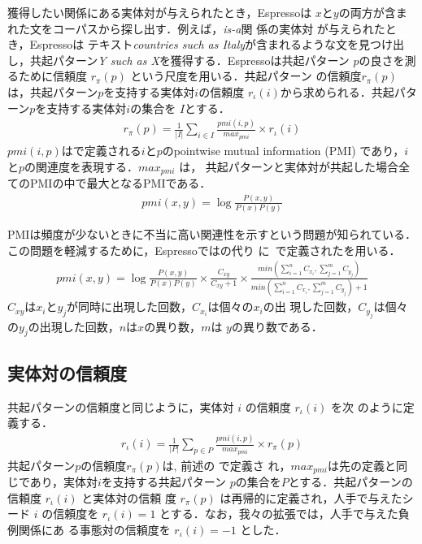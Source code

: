\documentclass[japanese]{jnlp_1.4}
\begin{document}
獲得したい関係にある実体対が与えられたとき，Espressoは
$x$と$y$の両方が含まれた文をコーパスから探し出す．例えば，\textsl{is-a}関
係の実体対 が与えられたとき，Espressoは
テキスト\textit{countries such as Italy}が含まれるような文を見つけ出
し，共起パターン\textit{Y such as X}を獲得する．Espressoは共起パターン
$p$の良さを測るために信頼度 $r_\pi(p)$ という尺度を用いる．共起パターン
の信頼度$r_\pi(p)$は，共起パターン$p$を支持する実体対$i$の信頼度
$r_\iota(i)$から求められる．共起パターン$p$を支持する実体対$i$の集合を
$I$とする．
\begin{eqnarray}
  \label{eq:rpi}
  r_\pi(p) = 
  \frac{1}{|I|}
  \sum_{i \in I}
  \frac{\mathit{pmi}(i,p)}{\mathit{max}_{pmi}}
  \times r_\iota(i)
\end{eqnarray}
$\mathit{pmi}(i,p)$はで定義される$i$と$p$のpointwise mutual
information (PMI) であり，$i$と$p$の関連度を表現する．$max_{pmi}$ は，
共起パターンと実体対が共起した場合全てのPMIの中で最大となるPMIである．
\begin{eqnarray}
  \label{eq:pmi}
  \mathit{pmi}(x, y) = \log\frac{P(x,y)}{P(x)P(y)}
\end{eqnarray}

PMIは頻度が少ないときに不当に高い関連性を示すという問題が知られている．
この問題を軽減するために，Espressoではの代り
に~\cite{pantel2004}で定義されたを用いる．
\begin{eqnarray}
  \label{eq:pmi2}
  \mathit{pmi}(x, y) = \log\frac{P(x,y)}{P(x)P(y)} \times
  \frac{C_{xy}}{C_{xy}+1} \times
  \frac{min(\sum_{i=1}^{n}C_{x_i},\sum_{j=1}^{m}C_{y_j})}{min(\sum_{i=1}^{n}C_{x_i},\sum_{j=1}^{m}C_{y_j})
  + 1}
\end{eqnarray}
$C_{xy}$は$x_i$と$y_j$が同時に出現した回数，$C_{x_i}$は個々の$x_i$の出
現した回数，$C_{y_j}$は個々の$y_j$の出現した回数，$n$は$x$の異り数，$m$は
$y$の異り数である．


\subsection{実体対の信頼度}

共起パターンの信頼度と同じように，実体対 $i$ の信頼度 $r_\iota(i)$ を次
のように定義する．
\begin{eqnarray}
  \label{eq:rl}
  r_\iota(i) = 
    \frac{1}{|P|}
    \sum_{p \in P}
      \frac{\mathit{pmi}(i,p)}{\mathit{max}_{pmi}}
      \times r_\pi(p)  
\end{eqnarray}
共起パターン$p$の信頼度$r_\pi(p)$は, 前述の  で定義さ
れ，$max_{pmi}$は先の定義と同じであり，実体対$i$を支持する共起パターン
$p$の集合を$P$とする．共起パターンの信頼度 $r_\iota(i)$ と実体対の信頼
度 $r_\pi(p)$ は再帰的に定義され，人手で与えたシード $i$ の信頼度を
$r_\iota(i) = 1$ とする．なお，我々の拡張では，人手で与えた負例関係にあ
る事態対の信頼度を $r_\iota(i) = -1$ とした．
\end{document}
